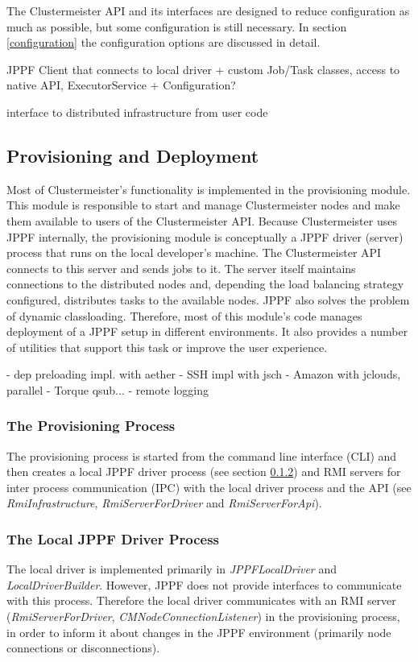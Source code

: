 \documentclass[12pt]{article}
\begin{document}
The Clustermeister API and its interfaces are designed to reduce configuration as much as possible, but some configuration is still necessary. In section \ref{configuration} the configuration options are discussed in detail.

JPPF Client that connects to local driver
+ custom Job/Task classes, access to native API, ExecutorService
+ Configuration?

interface to distributed infrastructure from user code

\subsection{Provisioning and Deployment}
Most of Clustermeister's functionality is implemented in the provisioning module. This module is responsible to start and manage Clustermeister nodes and make them available to users of the Clustermeister API. Because Clustermeister uses JPPF internally, the provisioning module is conceptually a JPPF driver (server) process that runs on the local developer's machine. The Clustermeister API connects to this server and sends jobs to it. The server itself maintains connections to the distributed nodes and, depending the load balancing strategy configured, distributes tasks to the available nodes. JPPF also solves the problem of dynamic classloading. Therefore, most of this module's code manages deployment of a JPPF setup in different environments. It also provides a number of utilities that support this task or improve the user experience.

- dep preloading impl. with aether
- SSH impl with jsch
- Amazon with jclouds, parallel
- Torque qsub...
- remote logging

\subsubsection{The Provisioning Process}
The provisioning process is started from the command line interface (CLI) and then creates a local JPPF driver process (see section \ref{localdriver}) and RMI servers for inter process communication (IPC) with the local driver process and the API (see \textit{RmiInfrastructure}, \textit{RmiServerForDriver} and \textit{RmiServerForApi}).

\subsubsection{The Local JPPF Driver Process}
\label{localdriver}
The local driver is implemented primarily in \textit{JPPFLocalDriver} and \textit{LocalDriverBuilder}. However, JPPF does not provide interfaces to communicate with this process. Therefore the local driver communicates with an RMI server (\textit{RmiServerForDriver}, \textit{CMNodeConnectionListener}) in the provisioning process, in order to inform it about changes in the JPPF environment (primarily node connections or disconnections).
\end{document}
